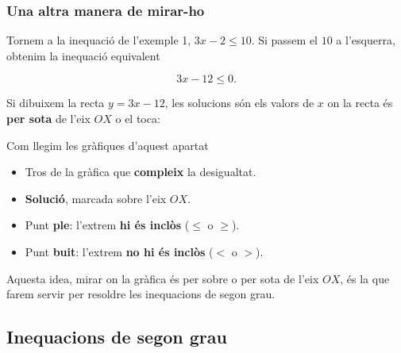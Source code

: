 \subsubsection{Una altra manera de mirar-ho}

Tornem a la inequació de l'exemple 1, $3x-2\leq 10$. Si passem el $10$ a l'esquerra, obtenim la inequació equivalent

\[
3x-12\leq 0.
\]

Si dibuixem la recta $y=3x-12$, les solucions són els valors de $x$ on la recta és \textbf{per sota} de l'eix $OX$ o el toca:

\begin{nota}{Com llegim les gràfiques d'aquest apartat}
\begin{itemize}
\item \mostracorba{} Tros de la gràfica que \textbf{compleix} la desigualtat.
\item \mostrainterval{} \textbf{Solució}, marcada sobre l'eix $OX$.
\item \mostraple{} Punt \textbf{ple}: l'extrem \textbf{hi és inclòs} ($\leq$ o $\geq$).
\item \mostrabuit{} Punt \textbf{buit}: l'extrem \textbf{no hi és inclòs} ($<$ o $>$).
\end{itemize}
\end{nota}

\begin{center}
\end{center}

Aquesta idea, mirar on la gràfica és per sobre o per sota de l'eix $OX$, és la que farem servir per resoldre les inequacions de segon grau.

\subsection{Inequacions de segon grau}

